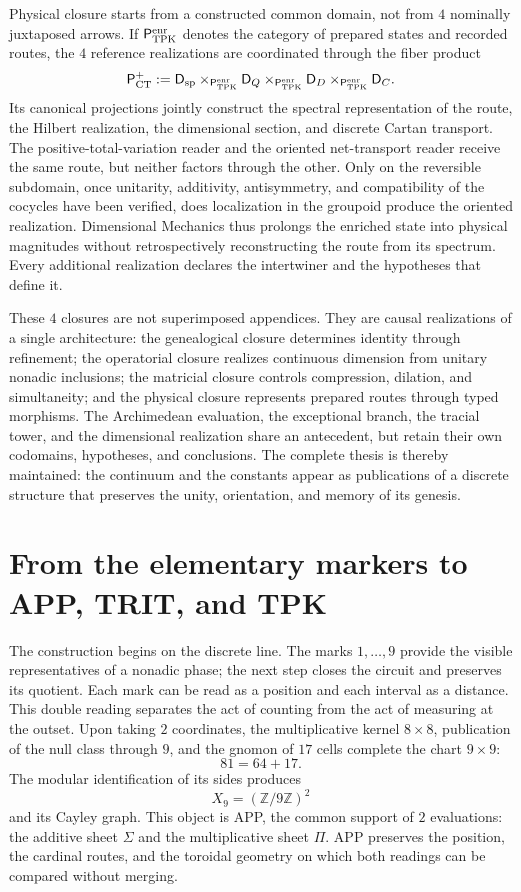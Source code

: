 Physical closure starts from a constructed common domain, not from \(4\) nominally juxtaposed arrows. If \(\mathsf P_{\rm TPK}^{\rm enr}\) denotes the category of prepared states and recorded routes, the \(4\) reference realizations are coordinated through the fiber product
\[
 \mathsf P_{\rm CT}^{+}
 :=\mathsf D_{\rm sp}
 \times_{\mathsf P_{\rm TPK}^{\rm enr}}\mathsf D_Q
 \times_{\mathsf P_{\rm TPK}^{\rm enr}}\mathsf D_D
 \times_{\mathsf P_{\rm TPK}^{\rm enr}}\mathsf D_C.
\]
Its canonical projections jointly construct the spectral representation of the route, the Hilbert realization, the dimensional section, and discrete Cartan transport. The positive-total-variation reader and the oriented net-transport reader receive the same route, but neither factors through the other. Only on the reversible subdomain, once unitarity, additivity, antisymmetry, and compatibility of the cocycles have been verified, does localization in the groupoid produce the oriented realization. Dimensional Mechanics thus prolongs the enriched state into physical magnitudes without retrospectively reconstructing the route from its spectrum. Every additional realization declares the intertwiner and the hypotheses that define it.

These \(4\) closures are not superimposed appendices. They are causal realizations of a single architecture: the genealogical closure determines identity through refinement; the operatorial closure realizes continuous dimension from unitary nonadic inclusions; the matricial closure controls compression, dilation, and simultaneity; and the physical closure represents prepared routes through typed morphisms. The Archimedean evaluation, the exceptional branch, the tracial tower, and the dimensional realization share an antecedent, but retain their own codomains, hypotheses, and conclusions. The complete thesis is thereby maintained: the continuum and the constants appear as publications of a discrete structure that preserves the unity, orientation, and memory of its genesis.

\section*{From the elementary markers to APP, TRIT, and TPK}

The construction begins on the discrete line. The marks \(1,\ldots,9\) provide the visible representatives of a nonadic phase; the next step closes the circuit and preserves its quotient. Each mark can be read as a position and each interval as a distance. This double reading separates the act of counting from the act of measuring at the outset. Upon taking \(2\) coordinates, the multiplicative kernel \(8\times8\), publication of the null class through \(9\), and the gnomon of \(17\) cells complete the chart \(9\times9\):
\[
 81=64+17.
\]
The modular identification of its sides produces
\[
 X_9=(\mathbb Z/9\mathbb Z)^2
\]
and its Cayley graph. This object is APP, the common support of \(2\) evaluations:
the additive sheet \(\Sigma\) and the multiplicative sheet \(\Pi\). APP preserves the
position, the cardinal routes, and the toroidal geometry on which both
readings can be compared without merging.

